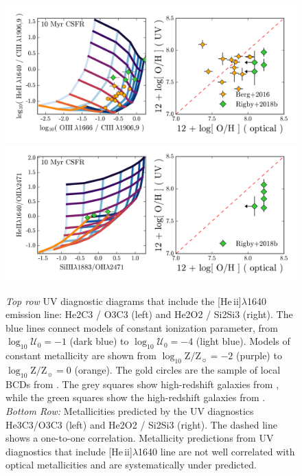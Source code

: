 \documentclass[preprint2]{aastex62}
\newcommand{\heii}{[He\,{\sc ii}]\xspace}
\newcommand{\logten}{\ensuremath{\log_{10}}}
\newcommand{\logZeq}[1]{\ensuremath{\logten \mathrm{Z}/\mathrm{Z}_{\sun} = #1}}
\newcommand{\logUeq}[1]{\ensuremath{\logten \mathcal{U}_0 = #1}}
\begin{document}
\begin{figure}
  \begin{center}
    \includegraphics[width=\linewidth]{figs/f4.png}
    \includegraphics[width=\linewidth]{figs/f4b.png}
    \caption{\emph{Top row} UV diagnostic diagrams that include the \heii$\lambda$1640 emission line: He2C3 / O3C3 (left) and He2O2 / Si2Si3 (right).  The blue lines connect models of constant ionization parameter, from \logUeq{-1} (dark blue) to \logUeq{-4} (light blue). Models of constant metallicity are shown from \logZeq{-2} (purple) to \logZeq{0} (orange).  The gold circles are the sample of local BCDs from \citet{Berg+2016}. The grey squares show high-redshift galaxies from \citet{Stark+2014}, while the green squares show the high-redshift galaxies from \citet{Rigby+2018b}. \emph{Bottom Row:} Metallicities predicted by the UV diagnostics He3C3/O3C3 (left) and He2O2 / Si2Si3 (right). The dashed line shows a one-to-one correlation. Metallicity predictions from UV diagnostics that include \heii$\lambda$1640 line are not well correlated with optical metallicities and are systematically under predicted.}
    \label{fig:UVHe}
  \end{center}
\end{figure}
\end{document}
